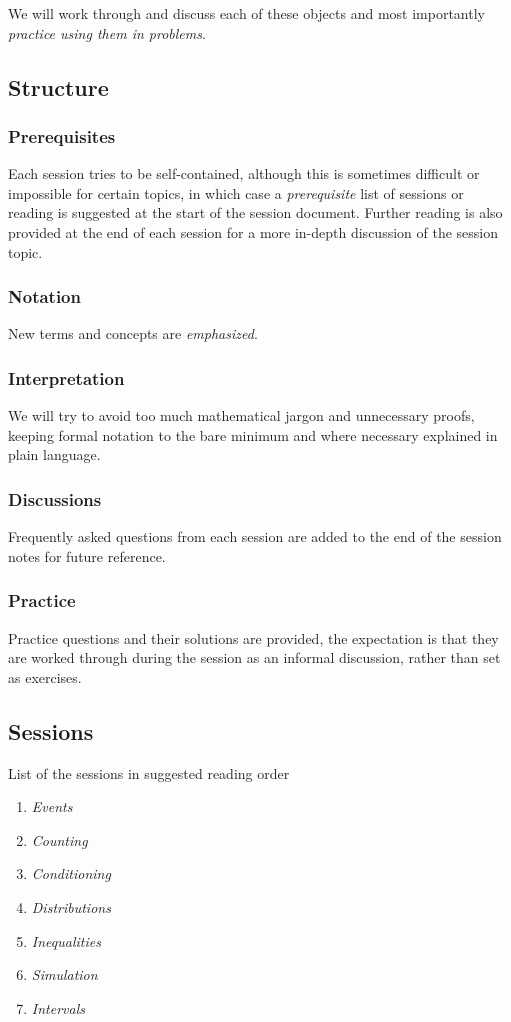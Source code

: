 \documentclass[11pt,a4paper]{article}
\begin{document}
We will work through and discuss each of these objects 
and most importantly \emph{practice using them in problems}. 

\subsection{Structure}

\subsubsection{Prerequisites}

Each session tries to be self-contained, 
although this is sometimes difficult or impossible for certain topics, 
in which case a \emph{prerequisite} list of sessions or reading is suggested at the start of the session document. 
Further reading is also provided at the end of each session for a more in-depth discussion 
of the session topic.

\subsubsection{Notation}

New terms and concepts are \emph{emphasized}. 

\subsubsection{Interpretation}

We will try to avoid too much mathematical jargon and unnecessary proofs, 
keeping formal notation to the bare minimum and where necessary 
explained in plain language.

\subsubsection{Discussions}

Frequently asked questions from each session 
are added to the end of the session notes for future reference.

\subsubsection{Practice}

Practice questions and their solutions are provided, 
the expectation is that they are worked through during the session as an informal discussion, 
rather than set as exercises.

\subsection{Sessions}

List of the sessions in suggested reading order

\begin{enumerate}
\def\labelenumi{\arabic{enumi}.}
\item \emph{Events}
\item \emph{Counting}
\item \emph{Conditioning}
\item \emph{Distributions}
\item \emph{Inequalities}
\item \emph{Simulation}
\item \emph{Intervals}
\end{enumerate}
\end{document}
